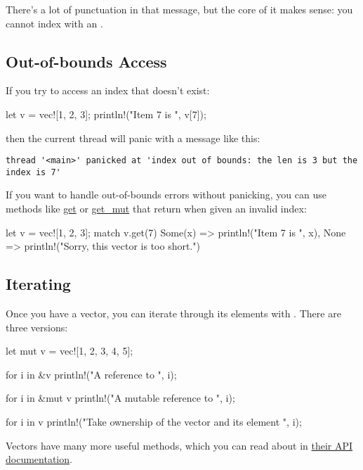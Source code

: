 There's a lot of punctuation in that message, but the core of it makes sense: you cannot index with an \itt.

\subsection*{Out-of-bounds Access}

If you try to access an index that doesn't exist:

\begin{rustc}
let v = vec![1, 2, 3];
println!("Item 7 is {}", v[7]);
\end{rustc}

then the current thread will panic with a message like this:

\begin{verbatim}
thread '<main>' panicked at 'index out of bounds: the len is 3 but the index is 7'
\end{verbatim}

If you want to handle out-of-bounds errors without panicking, you can use methods like 
\href{http://doc.rust-lang.org/std/vec/struct.Vec.html#method.get}{get} or 
\href{http://doc.rust-lang.org/std/vec/struct.Vec.html#method.get_mut}{get\_mut} that return  when given an invalid index:

\begin{rustc}
let v = vec![1, 2, 3];
match v.get(7) {
    Some(x) => println!("Item 7 is {}", x),
    None => println!("Sorry, this vector is too short.")
}
\end{rustc}

\subsection*{Iterating}

Once you have a vector, you can iterate through its elements with . There are three versions:

\begin{rustc}
let mut v = vec![1, 2, 3, 4, 5];

for i in &v {
    println!("A reference to {}", i);
}

for i in &mut v {
    println!("A mutable reference to {}", i);
}

for i in v {
    println!("Take ownership of the vector and its element {}", i);
}
\end{rustc}

Vectors have many more useful methods, which you can read about in \href{https://doc.rust-lang.org/std/vec/}{their API documentation}.
